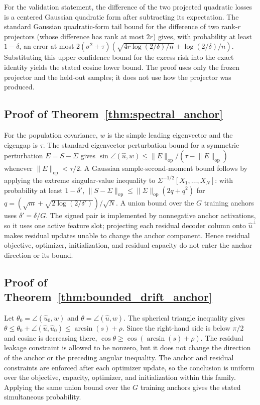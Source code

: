 \documentclass{article}
\theoremstyle{plain}
\begin{document}
{For the validation statement, the difference of the two projected quadratic losses is a centered Gaussian quadratic form after subtracting its expectation. The standard Gaussian quadratic-form tail bound for the difference of two rank-$r$ projectors (whose difference has rank at most $2r$) gives, with probability at least $1-\delta$, an error at most $2(\sigma^2+\tau)(\sqrt{4r\log(2/\delta)/n}+\log(2/\delta)/n)$. Substituting this upper confidence bound for the excess risk into the exact identity yields the stated cosine lower bound. The proof uses only the frozen projector and the held-out samples; it does not use how the projector was produced.

\subsection{Proof of Theorem~\ref{thm:spectral_anchor}}
For the population covariance, $w$ is the simple leading eigenvector and the eigengap is $\tau$. The standard eigenvector perturbation bound for a symmetric perturbation $E=S-\Sigma$ gives $\sin\angle(\widehat u,w)\le \lVert E\rVert_{\mathrm{op}}/(\tau-\lVert E\rVert_{\mathrm{op}})$ whenever $\lVert E\rVert_{\mathrm{op}}<\tau/2$. A Gaussian sample-second-moment bound follows by applying the extreme singular-value inequality to $\Sigma^{-1/2}[X_1,\ldots,X_N]$: with probability at least $1-\delta'$, $\lVert S-\Sigma\rVert_{\mathrm{op}}\le \lVert\Sigma\rVert_{\mathrm{op}}(2q+q^2)$ for $q=(\sqrt m+\sqrt{2\log(2/\delta')})/\sqrt N$. A union bound over the $G$ training anchors uses $\delta'=\delta/G$. The signed pair is implemented by nonnegative anchor activations, so it uses one active feature slot; projecting each residual decoder column onto $\widehat u^\perp$ makes residual updates unable to change the anchor component. Hence residual objective, optimizer, initialization, and residual capacity do not enter the anchor direction or its bound.

\subsection{Proof of Theorem~\ref{thm:bounded_drift_anchor}}
Let $\theta_0=\angle(\widehat u_0,w)$ and $\theta=\angle(\widehat u,w)$. The spherical triangle inequality gives $\theta\le\theta_0+\angle(\widehat u,\widehat u_0)\le\arcsin(s)+\rho$. Since the right-hand side is below $\pi/2$ and cosine is decreasing there, $\cos\theta\ge\cos(\arcsin(s)+\rho)$. The residual leakage constraint is allowed to be nonzero, but it does not change the direction of the anchor or the preceding angular inequality. The anchor and residual constraints are enforced after each optimizer update, so the conclusion is uniform over the objective, capacity, optimizer, and initialization within this family. Applying the same union bound over the $G$ training anchors gives the stated simultaneous probability.

}
\end{document}
